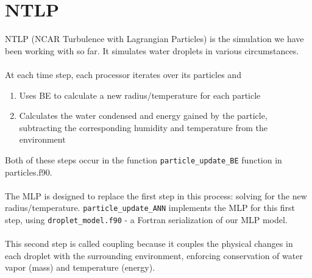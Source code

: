 \documentclass{article}
\begin{document}
\section{NTLP}
NTLP (NCAR Turbulence with Lagrangian Particles) is the simulation we have been working with so far. It simulates water droplets in various circumstances.\\\\
At each time step, each processor iterates over its particles and
\begin{enumerate}
	\item Uses BE to calculate a new radius/temperature for each particle
	\item Calculates the water condensed and energy gained by the particle, subtracting the corresponding humidity and temperature from the environment
\end{enumerate}
Both of these steps occur in the function \lstinline{particle_update_BE} function in particles.f90. \\\\
The MLP is designed to replace the first step in this process: solving for the new radius/temperature. \lstinline{particle_update_ANN} implements the MLP for this first step, using \lstinline{droplet_model.f90} - a Fortran serialization of our MLP model.\\\\
This second step is called coupling because it couples the physical changes in each droplet with the surrounding environment, enforcing conservation of water vapor (mass) and temperature (energy).
\end{document}
